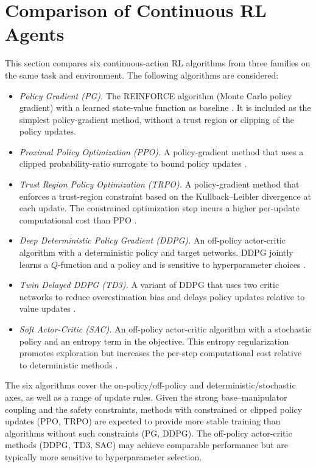 \documentclass{ieeeaccess}
\begin{document}
\section{Comparison of Continuous RL Agents} \label{comparison}
This section compares six continuous-action RL algorithms from three families on the same task
and environment. The following algorithms are considered:

\begin{itemize}
  \item \textit{Policy Gradient (PG).} The REINFORCE algorithm (Monte Carlo policy gradient) with a learned
  state-value function as baseline \cite{b7,b21}. It is included as the simplest policy-gradient method,
  without a trust region or clipping of the policy updates.
  \item \textit{Proximal Policy Optimization (PPO).} A policy-gradient method that uses a clipped
probability-ratio surrogate to bound policy updates \cite{b15}.
  \item \textit{Trust Region Policy Optimization (TRPO).} A policy-gradient method that enforces a trust-region
constraint based on the Kullback--Leibler divergence at each update. The constrained optimization step incurs
a higher per-update computational cost than PPO \cite{b14}.
  \item \textit{Deep Deterministic Policy Gradient (DDPG).} An off-policy actor-critic algorithm with a
deterministic policy and target networks. DDPG jointly learns a $Q$-function and a policy and
is sensitive to hyperparameter choices \cite{b16}.
  \item \textit{Twin Delayed DDPG (TD3).} A variant of DDPG that uses two critic networks
  to reduce overestimation bias and delays policy updates relative to value updates \cite{b17}.
  \item \textit{Soft Actor-Critic (SAC).} An off-policy actor-critic algorithm with a stochastic policy and an
  entropy term in the objective. This entropy regularization promotes exploration but increases the per-step
  computational cost relative to deterministic methods \cite{b18}.
\end{itemize}

The six algorithms cover the on-policy/off-policy and deterministic/stochastic axes, as well as a range
of update rules. Given the strong base--manipulator coupling and the safety constraints, methods with
constrained or clipped policy updates (PPO, TRPO) are expected to provide more stable training
than algorithms without such constraints (PG, DDPG). The off-policy actor-critic methods (DDPG, TD3, SAC)
may achieve comparable performance but are typically more sensitive to hyperparameter selection.
\end{document}
